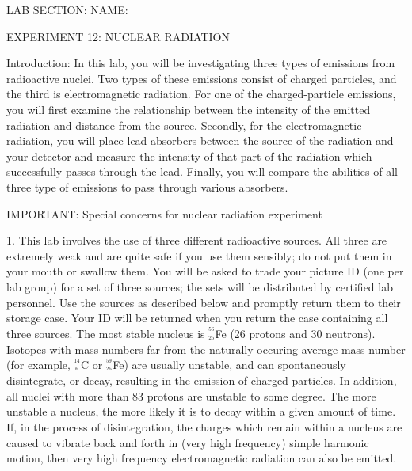 
\baselineskip=15pt
\vglue-0.7in
\hglue-2.0cm LAB SECTION:
\underbar{~~~~~~~~~~~~~~~~~~~~~~~~~~~~~~~~~~~~~~~~~~~~~~}
 NAME:
\rlap{
\underbar{~~~~~~~~~~~~~~~~~~~~~~~~~~~~~~~~~~~~~~~~~~~~~~}
}
\bigskip
\bigskip
\smallskip
\centerline{EXPERIMENT 12: NUCLEAR RADIATION}
\bigskip
Introduction:  In this lab, you will be investigating
three types of emissions from radioactive nuclei.  Two
types of these emissions consist of charged particles, 
and the third is electromagnetic radiation.  For one of
the charged-particle emissions, you will first examine 
the relationship between the intensity of the emitted 
radiation and distance from the source.  Secondly, for
the electromagnetic radiation, you will place lead 
absorbers between the source of the radiation and your 
detector and measure the intensity of that part of the 
radiation which successfully passes through the lead.  
Finally, you will compare the abilities of all three
type of emissions to pass through various absorbers.

\bigskip
IMPORTANT: Special concerns for nuclear radiation experiment
\item{1.} This lab involves the use of three different
radioactive sources.  All three are extremely weak and are 
quite safe if you use them sensibly; do not put them in your 
mouth or swallow them.  You will be asked to trade your
picture ID (one per lab group) for a set of three sources; 
the sets will be distributed by certified lab personnel.
Use the sources as described below and promptly return them 
to their storage case.  Your ID will be returned when you
return the case containing all three sources.
\bigskip
   The most stable nucleus is $^{^{56}}_{^{26}}$Fe (26 protons
and 30 neutrons).  Isotopes with mass numbers far from the 
naturally occuring average mass number (for example, 
$^{^{14}}_{^{~6}}$C or $^{^{59}}_{^{26}}$Fe) are usually 
unstable, and can spontaneously disintegrate, or decay, 
resulting in the emission of charged particles.  In addition, 
all nuclei with more than 83 protons are unstable to some 
degree.  The more unstable a nucleus, the more likely it is 
to decay within a given amount of time.  If, in the process 
of disintegration, the charges which remain within a nucleus 
are caused to vibrate back and forth in (very high frequency) 
simple harmonic motion, then very high frequency electromagnetic 
radiation can also be emitted.  

